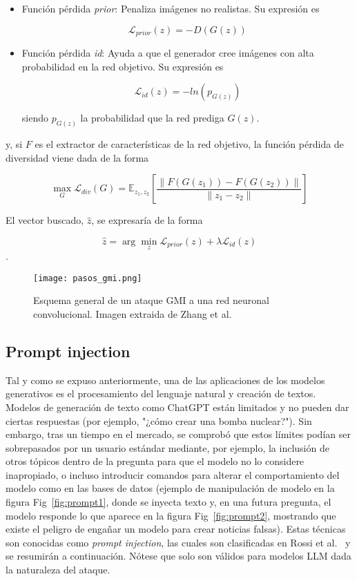 \begin{itemize}
	\item Función pérdida \textit{prior}: Penaliza imágenes no realistas. Su expresión es
	
	$$ \mathcal{L}_{prior} (z) = - D(G(z))$$
	
	\item Función pérdida \textit{id}: Ayuda a que el generador cree imágenes con alta probabilidad en la red objetivo. Su expresión es
	
	$$ \mathcal{L}_{id}(z) = - ln \left( p_{G(z)} \right)$$
	
	siendo $p_{G(z)}$ la probabilidad que la red prediga $G(z)$.
	
\end{itemize}

y, si $F$ es el extractor de características de la red objetivo, la función pérdida de diversidad viene dada de la forma

$$\max_{G} \mathcal{L}_{div} (G) = \mathbb{E}_{z_1,z_2} \left[ \frac{\|F(G(z_1)) - F(G(z_2))\|}{\|z_1 - z_2\|} \right]$$

El vector buscado, $\hat{z}$, se expresaría de la forma

$$\hat{z} = \arg \min_{z} \mathcal{L}_{prior} (z) + \lambda \mathcal{L}_{id} (z)$$.

\begin{figure}[h]
    \centering
    \texttt{[image: pasos\_gmi.png]}
    \caption{Esquema general de un ataque GMI a una red neuronal convolucional. Imagen extraida de Zhang et al.~\cite{InversionModelo}}
    \label{fig:pasos_gmi}
\end{figure}

\subsection*{Prompt injection}

Tal y como se expuso anteriormente, una de las aplicaciones de los modelos generativos es el procesamiento del lenguaje natural y creación de textos. Modelos de generación de texto como ChatGPT están limitados y no pueden dar ciertas respuestas (por ejemplo, "¿cómo crear una bomba nuclear?"). Sin embargo, tras un tiempo en el mercado, se comprobó que estos límites podían ser sobrepasados por un usuario estándar mediante, por ejemplo, la inclusión de otros tópicos dentro de la pregunta para que el modelo no lo considere inapropiado, o incluso introducir comandos para alterar el comportamiento del modelo como en las bases de datos (ejemplo de manipulación de modelo en la figura Fig~\ref{fig:prompt1}, donde se inyecta texto y, en una futura pregunta, el modelo responde lo que aparece en la figura Fig~\ref{fig:prompt2}, mostrando que existe el peligro de engañar un modelo para crear noticias falsas). Estas técnicas son conocidas como \textit{prompt injection}, las cuales son clasificadas en Rossi et al.~\cite{PromptInject} y se resumirán a continuación. Nótese que solo son válidos para modelos LLM dada la naturaleza del ataque.

